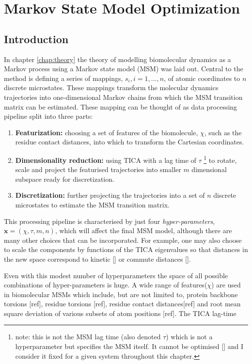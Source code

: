 \let\textcircled=\pgftextcircled
\chapter{Markov State Model Optimization}
\label{chap:msm}



\section{Introduction}

In chapter \ref{chap:theory} the theory of modelling biomolecular dynamics as a Markov process using a Markov state model (MSM) was laid out. Central to the method is defining  a series of mappings, $s_i, i=1, ..., n$, of atomic coordinates to $n$ discrete microstates. These mappings transform the molecular dynamics trajectories into one-dimensional Markov chains from which the MSM transition matrix can be estimated. These mapping can be thought of as data processing pipeline split into three parts: 

\begin{enumerate}
    \item \textbf{Featurization:} choosing a set of features of the biomolecule, $\chi$, such as the residue contact distances, into which to transform the Cartesian coordinates.  
    \item \textbf{Dimensionality reduction:} using  TICA with a lag time of $\tau$ \footnote{note: this is not the MSM lag time (also denoted $\tau$) which is not a hyperparameter but specifies the MSM itself. It cannot be optimised [] and I consider it fixed for a given system throughout this chapter.} to rotate, scale and project the featurised trajectories into smaller $m$ dimensional subspace ready for discretization.  
    \item \textbf{Discretization:} further projecting the trajectories into a set of $n$ discrete microstates to estimate the MSM transition matrix. 
\end{enumerate}
This processing pipeline is characterised by just four \emph{hyper-parameters}, $\mathbf{x} = (\chi, \tau, m, n)$, which will affect the final MSM model, although there are many other choices that can be incorporated. For example, one may also choose to scale the components by functions of the TICA eigenvalues so that distances in the new space correspond to kinetic [] or commute distances []. 

Even with this modest number of hyperparameters the space of all possible combinations of hyper-parameters is huge. A wide range of features($\chi$) are used in biomolecular MSMs which include, but are not limited to, protein backbone torsions [ref], residue torsions [ref], residue contact distances[ref] and root mean square deviation of various subsets of atom positions [ref]. The TICA lag-time


